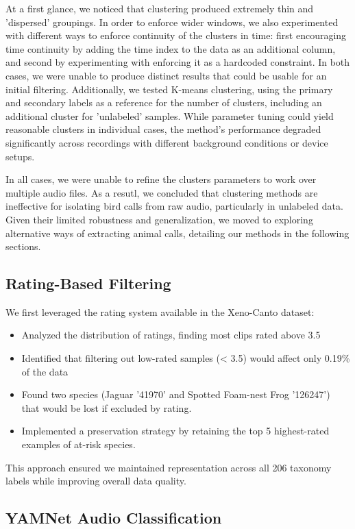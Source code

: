 \documentclass[10pt]{article}
\begin{document}
At a first glance, we noticed that clustering produced extremely thin and 'dispersed' groupings. In order to enforce wider windows, we also experimented with different ways to enforce continuity of the clusters in time: first encouraging time continuity by adding the time index to the data as an additional column, and second by experimenting with enforcing it as a hardcoded constraint. In both cases, we were unable to produce distinct results that could be usable for an initial filtering. Additionally, we tested K-means clustering, using the primary and secondary labels as a reference for the number of clusters, including an additional cluster for 'unlabeled' samples. While parameter tuning could yield reasonable clusters in individual cases, the method's performance degraded significantly across recordings with different background conditions or device setups.

In all cases, we were unable to refine the clusters parameters to work over multiple audio files. As a resutl, we concluded that clustering methods are ineffective for isolating bird calls from raw audio, particularly in unlabeled data. Given their limited robustness and generalization, we moved to exploring alternative ways of extracting animal calls, detailing our methods in the following sections.

\subsection*{Rating-Based Filtering}

We first leveraged the rating system available in the Xeno-Canto dataset:

\begin{itemize}
  \item Analyzed the distribution of ratings, finding most clips rated above 3.5
  \item Identified that filtering out low-rated samples (< 3.5) would affect only 0.19\% of the data
  \item Found two species (Jaguar '41970' and Spotted Foam-nest Frog '126247') that would be lost if excluded by rating.
  \item Implemented a preservation strategy by retaining the top 5 highest-rated examples of at-risk species.
\end{itemize}

This approach ensured we maintained representation across all 206 taxonomy labels while improving overall data quality.

\subsection*{YAMNet Audio Classification}
\end{document}
